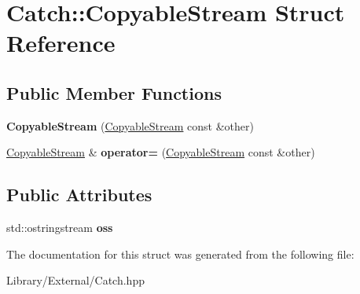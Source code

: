 \hypertarget{struct_catch_1_1_copyable_stream}{}\section{Catch\+:\+:Copyable\+Stream Struct Reference}
\label{struct_catch_1_1_copyable_stream}
\subsection*{Public Member Functions}
\begin{DoxyCompactItemize}
\item 
\hypertarget{struct_catch_1_1_copyable_stream_a0e72dc16240653f52c17106f4bf34da8}{}{\bfseries Copyable\+Stream} (\hyperlink{struct_catch_1_1_copyable_stream}{Copyable\+Stream} const \&other)\label{struct_catch_1_1_copyable_stream_a0e72dc16240653f52c17106f4bf34da8}

\item 
\hypertarget{struct_catch_1_1_copyable_stream_a1760fa29b38011c5845171260bec0966}{}\hyperlink{struct_catch_1_1_copyable_stream}{Copyable\+Stream} \& {\bfseries operator=} (\hyperlink{struct_catch_1_1_copyable_stream}{Copyable\+Stream} const \&other)\label{struct_catch_1_1_copyable_stream_a1760fa29b38011c5845171260bec0966}

\end{DoxyCompactItemize}
\subsection*{Public Attributes}
\begin{DoxyCompactItemize}
\item 
\hypertarget{struct_catch_1_1_copyable_stream_ae123fb4d673e7d7a13a3c5f6bc5d426c}{}std\+::ostringstream {\bfseries oss}\label{struct_catch_1_1_copyable_stream_ae123fb4d673e7d7a13a3c5f6bc5d426c}

\end{DoxyCompactItemize}


The documentation for this struct was generated from the following file\+:\begin{DoxyCompactItemize}
\item 
Library/\+External/Catch.\+hpp\end{DoxyCompactItemize}
